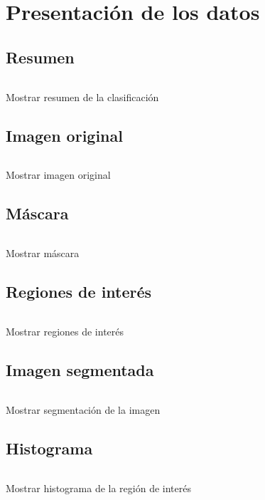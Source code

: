 \section{Presentación de los datos}

\subsection{Resumen}
\begin{listing}[!ht]
\inputminted{python}{code_listings/show_summary.py}
\caption{Mostrar resumen de la clasificación}
\label{code:show_summary}
\end{listing}

\subsection{Imagen original}
\begin{listing}[!ht]
\inputminted{python}{code_listings/show_original_image.py}
\caption{Mostrar imagen original}
\label{code:show_original_image}
\end{listing}

\subsection{Máscara}
\begin{listing}[!ht]
\inputminted{python}{code_listings/show_mask.py}
\caption{Mostrar máscara}
\label{code:show_mask}
\end{listing}

\subsection{Regiones de interés}
\begin{listing}[!ht]
\inputminted{python}{code_listings/show_roi.py}
\caption{Mostrar regiones de interés}
\label{code:show_roi}
\end{listing}

\subsection{Imagen segmentada}
\begin{listing}[!ht]
\inputminted{python}{code_listings/show_segmentation.py}
\caption{Mostrar segmentación de la imagen}
\label{code:show_segmentation}
\end{listing}

\subsection{Histograma}
\begin{listing}[!ht]
\inputminted{python}{code_listings/show_histogram.py}
\caption{Mostrar histograma de la región de interés}
\label{code:show_histogram}
\end{listing}